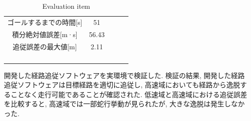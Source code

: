 \begin{table}[H]
     \centering
     \caption{Evaluation item}
     \begin{tabular}{cclll}
     \multicolumn{1}{c|}{ゴールするまでの時間{[}s{]}}           & 51   &  &  &  \\
     \multicolumn{1}{c|}{積分絶対値誤差{[}m·s{]}} & 56.43 &  &  &  \\
     \multicolumn{1}{c|}{追従誤差の最大値{[}m{]}} & 2.11 &  &  &  \\
                                                &      &  &  &  \\
                                                &      &  &  &  \\
     \multicolumn{1}{l}{}                       &      &  &  &  \\
     \multicolumn{1}{l}{}                       &      &  &  & 
     \end{tabular}
\end{table}

開発した経路追従ソフトウェアを実環境で検証した.
検証の結果, 開発した経路追従ソフトウェアは目標経路を適切に追従し, 高速域においても経路から逸脱することなく走行可能であることが確認された.
低速域と高速域における追従誤差を比較すると, 高速域では一部蛇行挙動が見られたが, 大きな逸脱は発生しなかった.